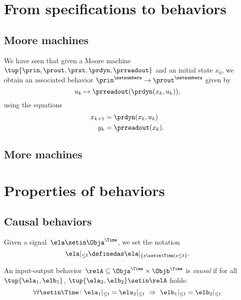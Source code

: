 \section{From specifications to behaviors}


\subsection{Moore machines}

We have seen that given a Moore machine $\tup{\prin, \prout, \prst, \prdyn, \prreadout}$ and an initial state $x_0$, we obtain an associated behavior $\prin^\natnumbers \to  \prout^\natnumbers$ given by
\begin{equation}
    u_k \mapsto \prreadout(\prdyn(x_k, u_k)),
\end{equation}
using the equations
\begin{align}
    x_{k+1} & = \prdyn(x_k, u_k) \\
    y_{k}   & = \prreadout(x_{k}).
\end{align}

\subsection{More machines}

\section{Properties of behaviors}

\subsection{Causal behaviors}

Given a signal~$\ela \setin \Obja^\Time$, we set the notation
\begin{equation}
    \ela \vert_{\leq t} \definedas  \ela \vert_{\{ s \setin \Time \mid s \leq t\}}.
\end{equation}

\begin{definition}
    An input-output behavior~$\relA \subseteq \Obja^\Time \times \Objb^\Time$ is \emph{causal} if for all~$\tup{\ela_1, \elb_1}$, $\tup{\ela_2, \elb_2} \setin \relA$ holds:
    \begin{equation*}
        \forall t \setin \Time\colon \ela_1 \vert_{ \leq t} = \ela_2 \vert_{ \leq t} \  \Rightarrow \ \elb_1 \vert_{ \leq t} = \elb_2 \vert_{ \leq t}
    \end{equation*}
\end{definition}

